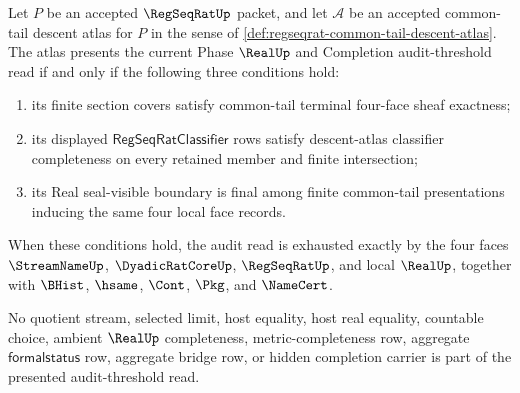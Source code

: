 \begin{theorem}
\label{thm:regseqrat-common-tail-descent-atlas-threshold-fusion}
Let $P$ be an accepted $\RegSeqRatUp$ packet, and let $\mathcal A$ be an accepted common-tail descent atlas for $P$ in the sense of \autoref{def:regseqrat-common-tail-descent-atlas}. The atlas presents the current Phase $\RealUp$ and Completion audit-threshold read if and only if the following three conditions hold:
\begin{enumerate}
\item its finite section covers satisfy common-tail terminal four-face sheaf exactness;
\item its displayed $\mathsf{RegSeqRatClassifier}$ rows satisfy descent-atlas classifier completeness on every retained member and finite intersection;
\item its Real seal-visible boundary is final among finite common-tail presentations inducing the same four local face records.
\end{enumerate}
When these conditions hold, the audit read is exhausted exactly by the four faces $\StreamNameUp$, $\DyadicRatCoreUp$, $\RegSeqRatUp$, and local $\RealUp$, together with $\BHist$, $\hsame$, $\Cont$, $\Pkg$, and $\NameCert$.

No quotient stream, selected limit, host equality, host real equality, countable choice, ambient $\RealUp$ completeness, metric-completeness row, aggregate $\mathsf{formalstatus}$ row, aggregate bridge row, or hidden completion carrier is part of the presented audit-threshold read.
\end{theorem}
